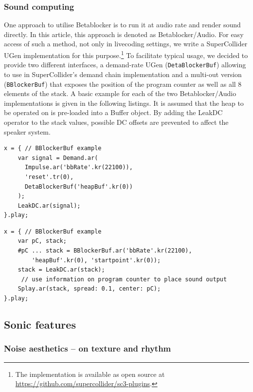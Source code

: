\documentclass[letterpaper, 12pt]{article}
\begin{document}
\subsubsection{Sound computing} 
\label{sub:sound_computing}

One approach to utilise Betablocker is to run it at audio rate and render sound directly.
In this article, this approach is denoted as Betablocker/Audio.
For easy access of such a method, not only in livecoding settings, we write a SuperCollider UGen implementation for this purpose.\footnote{The implementation is available as open source at \url{https://github.com/supercollider/sc3-plugins}.}
To facilitate typical usage, we decided to provide two different interfaces, a demand-rate UGen (\verb#DetaBlockerBuf#) allowing to use in SuperCollider's demand chain implementation 
and a multi-out version (\verb#BBlockerBuf#) that exposes the position of the program counter as well as all 8 elements of the stack.
A basic example for each of the two Betablocker/Audio implementations is given in the following listings.
It is assumed that the heap to be operated on is pre-loaded into a Buffer object.
By adding the LeakDC operator to the stack values, possible DC offsets are prevented to affect the speaker system.

\begin{Verbatim}[fontfamily=courier, xleftmargin=\parindent]
x = { // BBlockerBuf example
	var signal = Demand.ar(
	  Impulse.ar('bbRate'.kr(22100)), 
	  'reset'.tr(0),
	  DetaBlockerBuf('heapBuf'.kr(0))
	);
	LeakDC.ar(signal);
}.play;
\end{Verbatim}

\begin{Verbatim}[fontfamily=courier, xleftmargin=\parindent]
x = { // BBlockerBuf example
	var pC, stack;
	#pC ... stack = BBlockerBuf.ar('bbRate'.kr(22100), 
		'heapBuf'.kr(0), 'startpoint'.kr(0));
	stack = LeakDC.ar(stack);
	 // use information on program counter to place sound output
	Splay.ar(stack, spread: 0.1, center: pC);
}.play;
\end{Verbatim}


\subsection{Sonic features} 
\label{sub:sonic_features}


\subsubsection{Noise aesthetics -- on texture and rhythm} 
\label{sub:noise_aesthetics}
\end{document}
